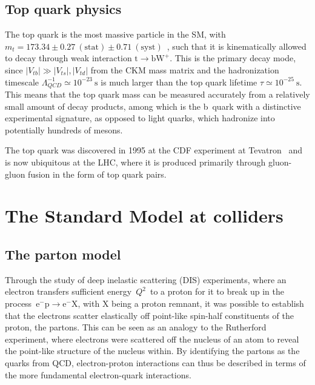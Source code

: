 \subsection{Top quark physics}
The top quark is the most massive particle in the SM, with $m_t = 173.34 \pm 0.27~\mathrm{(stat)} \pm 0.71~\mathrm{(syst)}$~\cite{ATLAS:2014wva}, such that it is kinematically allowed to decay through weak interaction $\mathrm{t} \rightarrow \mathrm{b} \mathrm{W}^+$. This is the primary decay mode, since $|V_{tb}| \gg |V_{ts}|, |V_{td}|$ from the CKM mass matrix and the hadronization timescale $\Lambda_{QCD}^{-1} \simeq 10^{-23}~\mathrm{s}$ is much larger than the top quark lifetime $\tau \simeq 10^{-25}~\mathrm{s}$. This means that the top quark mass can be measured accurately from a relatively small amount of decay products, among which is the b~quark with a distinctive experimental signature, as opposed to light quarks, which hadronize into potentially hundreds of mesons.

The top quark was discovered in 1995 at the CDF experiment at Tevatron~\cite{Abe:1995hr} and is now ubiquitous at the LHC, where it is produced primarily through gluon-gluon fusion in the form of top quark pairs.


\section{The Standard Model at colliders}
\subsection{The parton model}
Through the study of deep inelastic scattering (DIS) experiments, where an electron transfers sufficient energy~$Q^2$~to a proton for it to break up in the process~$\mathrm{e}^- \mathrm{p} \rightarrow \mathrm{e}^- \mathrm{X}$, with $\mathrm{X}$ being a proton remnant, it was possible to establish that the electrons scatter elastically off point-like spin-half constituents of the proton, the partons. This can be seen as an analogy to the Rutherford experiment, where electrons were scattered off the nucleus of an atom to reveal the point-like structure of the nucleus within. By identifying the partons as the quarks from QCD, electron-proton interactions can thus be described in terms of the more fundamental electron-quark interactions.

